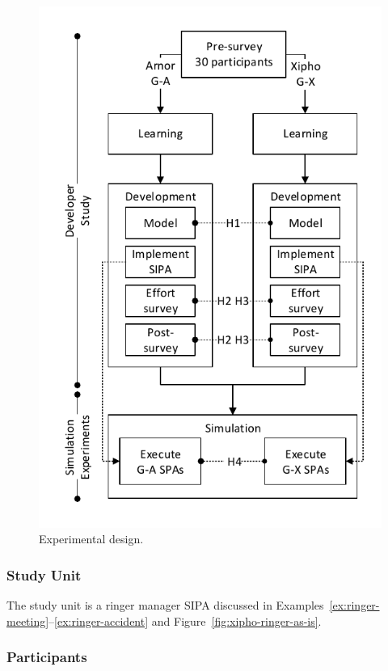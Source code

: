 \begin{figure}[!htb] \centering
\includegraphics[angle=0,width={0.60\columnwidth}]{Chapter-2/fig/design}
\caption[Experimental design]{Experimental design.}
\label{fig:design} \end{figure}

\subsubsection*{Study Unit} 

The study unit is a ringer manager SIPA discussed 
in Examples~\ref{ex:ringer-meeting}--\ref{ex:ringer-accident} and Figure~\ref{fig:xipho-ringer-as-is}.

\subsubsection*{Participants}


